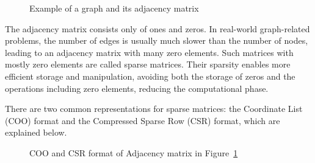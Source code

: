 \begin{figure}[t]
    \centering
    \hspace{0.15\textwidth}
    \caption{Example of a graph and its adjacency matrix}
    \label{fig:graph_adjacency}
\end{figure}

The adjacency matrix consists only of ones and zeros.
In real-world graph-related problems, the number of edges is usually much slower than the number of nodes, leading to an adjacency matrix with many zero elements.
Such matrices with mostly zero elements are called sparse matrices.
Their sparsity enables more efficient storage and manipulation, avoiding both the storage of zeros and the operations including zero elements, reducing the computational phase.

There are two common representations for sparse matrices: the Coordinate List (COO) format and the Compressed Sparse Row (CSR) format, which are explained below.

\begin{figure}[t]
    \centering
    \hspace{0.15\textwidth}
    \caption{COO and CSR format of Adjacency matrix in Figure~\ref{fig:graph_adjacency}}
    \label{fig:coo_csr}
\end{figure}

